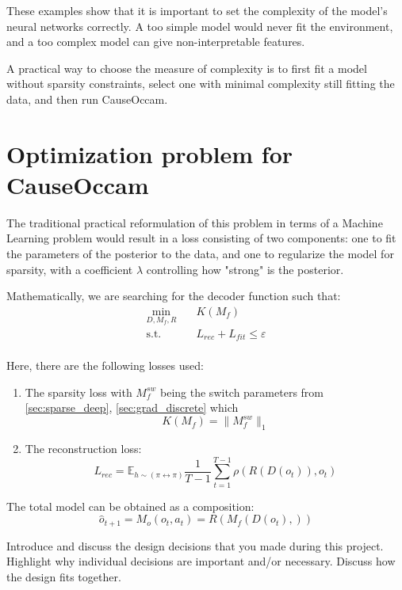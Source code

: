 \documentclass[a4paper,11pt,oneside]{report}
\newcommand{\sysname}{CauseOccam\xspace}
\begin{document}
These examples show that it is important to set the complexity of the model's neural networks correctly. A too simple model would never fit the environment, and a too complex model can give non-interpretable features.

A practical way to choose the measure of complexity is to first fit a model without sparsity constraints, select one with minimal complexity still fitting the data, and then run \sysname.

\section{Optimization problem for \sysname}

The traditional practical reformulation of this problem in terms of a Machine Learning problem would result in a loss consisting of two components: one to fit the parameters of the posterior to the data, and one to regularize the model for sparsity, with a coefficient $\lambda$ controlling how "strong" is the posterior.


Mathematically, we are searching for the decoder function such that:
\begin{equation}
\label{eq:sparse_rl_problem}
\begin{aligned}
    \min_{D,M_f,R} \quad & K(M_f)\\
    \textrm{s.t.} \quad & L_{rec}+L_{fit}\leq\varepsilon \\
\end{aligned}
\end{equation}

Here, there are the following losses used:
\begin{enumerate}
\item The sparsity loss with $M_f^{sw}$ being the switch parameters from \autoref{sec:sparse_deep}, \autoref{sec:grad_discrete} which
\begin{equation}
\label{eq:sparsity}
K(M_f)=\|M_f^{sw}\|_1
\end{equation}
\item The reconstruction loss:
$$L_{rec}=\mathbb E_{h\sim (\pi\leftrightarrow\pi)}\frac{1}{T-1}\sum\limits_{t=1}^{T-1}\rho(R(D(o_t)),o_t)$$
\end{enumerate}


The total model can be obtained as a composition:
$$
\hat{o}_{t+1}=M_o(o_t,a_t)=R(M_f(D(o_t), ))
$$


Introduce and discuss the design decisions that you made during this project.
Highlight why individual decisions are important and/or necessary. Discuss
how the design fits together.
\end{document}

